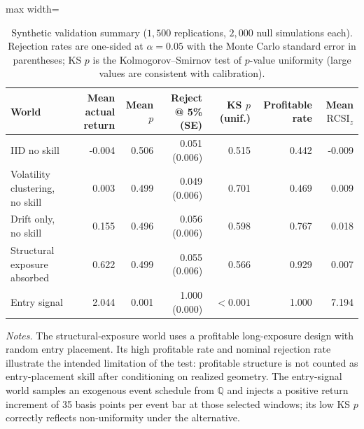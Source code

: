 \documentclass[preprint,12pt]{elsarticle}
\theoremstyle{definition}
\begin{document}
\begin{table}[H]
\centering
\caption{Synthetic validation summary ($1{,}500$ replications, $2{,}000$ null simulations each). Rejection rates are one-sided at $\alpha=0.05$ with the Monte Carlo standard error in parentheses; KS $p$ is the Kolmogorov--Smirnov test of $p$-value uniformity (large values are consistent with calibration).}
\label{tab:synthetic_validation}
{\small
\renewcommand{\arraystretch}{1.12}
\begin{adjustbox}{max width=\textwidth}
\begin{tabular}{@{}lrrrrrr@{}}
\toprule
World & Mean actual return & Mean $p$ & Reject @ 5\% (SE) & KS $p$ (unif.) & Profitable rate & Mean $\mathrm{RCSI}_z$ \\
\midrule
IID no skill & -0.004 & 0.506 & 0.051 (0.006) & 0.515 & 0.442 & -0.009 \\
Volatility clustering, no skill & \phantom{-}0.003 & 0.499 & 0.049 (0.006) & 0.701 & 0.469 & \phantom{-}0.009 \\
Drift only, no skill & \phantom{-}0.155 & 0.496 & 0.056 (0.006) & 0.598 & 0.767 & \phantom{-}0.018 \\
Structural exposure absorbed & \phantom{-}0.622 & 0.499 & 0.055 (0.006) & 0.566 & 0.929 & \phantom{-}0.007 \\
Entry signal & \phantom{-}2.044 & 0.001 & 1.000 (0.000) & $<0.001$ & 1.000 & \phantom{-}7.194 \\
\bottomrule
\end{tabular}
\end{adjustbox}
}
\par\vspace{0.5em}
\begin{minipage}{0.95\textwidth}
\centering
\footnotesize\emph{Notes.} The structural-exposure world uses a profitable long-exposure design with random entry placement. Its high profitable rate and nominal rejection rate illustrate the intended limitation of the test: profitable structure is not counted as entry-placement skill after conditioning on realized geometry. The entry-signal world samples an exogenous event schedule from $\mathbb{Q}$ and injects a positive return increment of 35 basis points per event bar at those selected windows; its low KS $p$ correctly reflects non-uniformity under the alternative.
\end{minipage}
\end{table}
\end{document}
